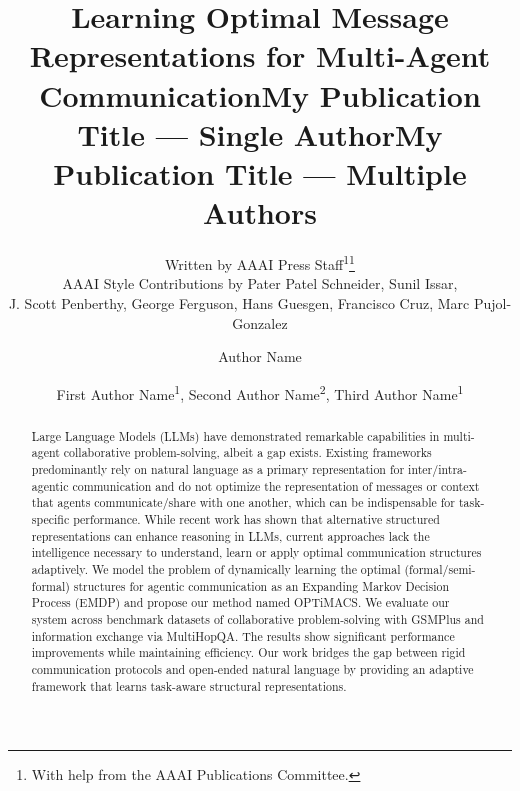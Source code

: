 \documentclass[letterpaper]{article} %
\title{Learning Optimal Message Representations for Multi-Agent Communication}
\author{
    Written by AAAI Press Staff\textsuperscript{\rm 1}\thanks{With help from the AAAI Publications Committee.}\\
    AAAI Style Contributions by Pater Patel Schneider,
    Sunil Issar,\\
    J. Scott Penberthy,
    George Ferguson,
    Hans Guesgen,
    Francisco Cruz\equalcontrib,
    Marc Pujol-Gonzalez\equalcontrib
}
\title{My Publication Title --- Single Author}
\author {
    Author Name
}
\title{My Publication Title --- Multiple Authors}
\author {
    First Author Name\textsuperscript{\rm 1},
    Second Author Name\textsuperscript{\rm 2},
    Third Author Name\textsuperscript{\rm 1}
}
\newcommand{\method}{OPTiMACS\xspace}
\begin{document}
\maketitle

\begin{abstract}
Large Language Models (LLMs) have demonstrated remarkable capabilities in multi-agent collaborative problem-solving, albeit a gap exists. Existing frameworks predominantly rely on natural language as a primary representation for inter/intra-agentic communication and do not optimize the representation of messages or context that agents communicate/share with one another, which can be indispensable for task-specific performance. 
While recent work has shown that alternative structured representations can enhance reasoning in LLMs, current approaches lack the intelligence necessary to understand, learn or apply optimal communication structures adaptively. 
We model the problem of dynamically learning the optimal (formal/semi-formal) structures for agentic communication as an Expanding Markov Decision Process (EMDP) and propose our method named \method.
We evaluate our system across benchmark datasets of collaborative problem-solving with GSMPlus and information exchange via MultiHopQA. 
The results show significant performance improvements while maintaining efficiency.
Our work bridges the gap between rigid communication protocols and open-ended natural language by providing an adaptive framework that learns task-aware structural representations.

\end{abstract}
\end{document}
